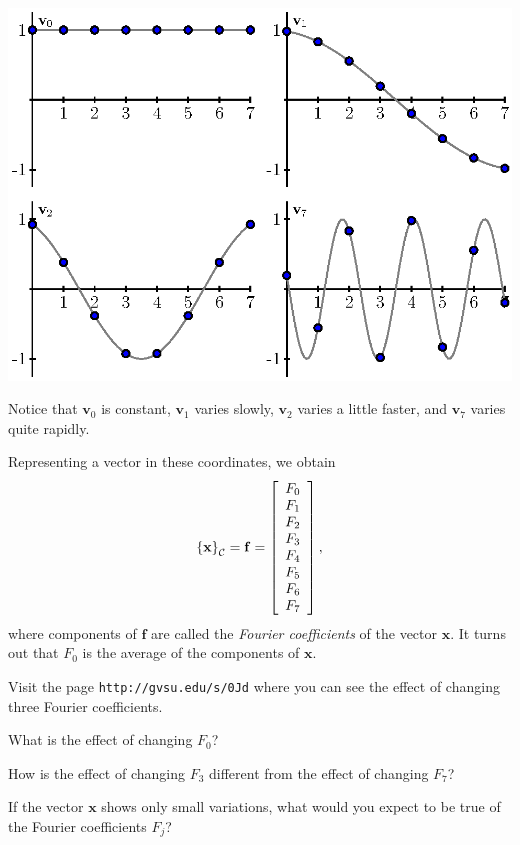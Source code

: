 \documentclass[12pt]{article}
\newcommand{\vs}[1]{\vspace{#1in}}
\newcommand{\fvec}{{\mathbf f}}
\newcommand{\vvec}{{\mathbf v}}
\newcommand{\xvec}{{\mathbf x}}
\newcommand{\ccal}{{\cal C}}
\newcommand{\coords}[2]{\left\{#1\right\}_{#2}}
\begin{document}
\begin{enumerate}
    \begin{center}
      \includegraphics{jpeg-fourier-basis.eps}
    \end{center}

    Notice that $\vvec_0$ is constant, $\vvec_1$ varies slowly,
    $\vvec_2$ varies a little faster, and $\vvec_7$ varies quite
    rapidly.

    Representing a vector in these coordinates, we obtain
    $$
    \coords{\xvec}{\ccal} =
    \fvec = 
    \left[
      \begin{array}{c}
        F_0 \\ F_1 \\ F_2 \\ F_3 \\ F_4 \\ F_5 \\ F_6 \\ F_7 \\
      \end{array}
    \right],
    $$
    where components of $\fvec$ are called the {\em Fourier
      coefficients} of the 
    vector $\xvec$.  It turns out that $F_0$ is the average of the
    components of $\xvec$.

    Visit the page {\tt http://gvsu.edu/s/0Jd} where you can see the
    effect of changing three Fourier coefficients.

    What is the effect of changing $F_0$?

    \vs{1}
    How is the effect of changing $F_3$ different from the effect of
    changing $F_7$?

    \vs{1}
    If the vector $\xvec$ shows only small variations, what would you
    expect to be true of the Fourier coefficients $F_j$?


\end{enumerate}
\end{document}
